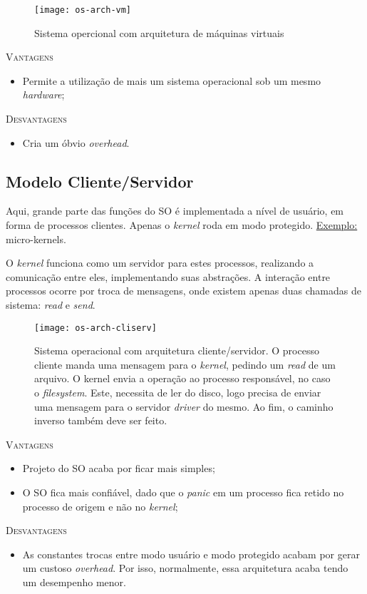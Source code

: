 \begin{figure}[ht]
  \centering
  \texttt{[image: os-arch-vm]}
  \caption{Sistema opercional com arquitetura de máquinas virtuais}
  \label{fig:os-arch-vm}
\end{figure}

\textsc{Vantagens}
\begin{itemize}
  \item Permite a utilização de mais um sistema operacional sob um mesmo \textit{hardware};
\end{itemize}

\textsc{Desvantagens}
\begin{itemize}
  \item Cria um óbvio \textit{overhead}.
\end{itemize}






\subsection{Modelo Cliente/Servidor}
Aqui, grande parte das funções do SO é implementada a nível de usuário, em forma de processos clientes. Apenas o \textit{kernel} roda em modo protegido.
\underline{Exemplo:} micro-kernels.

O \textit{kernel} funciona como um servidor para estes processos, realizando a comunicação entre eles, implementando suas abstrações. A interação entre processos ocorre por troca de mensagens, onde existem apenas duas chamadas de sistema: \textit{read} e \textit{send}.

\begin{figure}[ht]
  \centering
  \texttt{[image: os-arch-cliserv]}
  \caption{Sistema operacional com arquitetura cliente/servidor. O processo cliente manda uma mensagem para o \textit{kernel}, pedindo um \textit{read} de um arquivo. O kernel envia a operação ao processo responsável, no caso o \textit{filesystem}. Este, necessita de ler do disco, logo precisa de enviar uma mensagem para o servidor \textit{driver} do mesmo. Ao fim, o caminho inverso também deve ser feito.}
  \label{fig:os-arch-cliserv}
\end{figure}

\textsc{Vantagens}
\begin{itemize}
  \item Projeto do SO acaba por ficar mais simples;
  \item O SO fica mais confiável, dado que o \textit{panic} em um processo fica retido no processo de origem e não no \textit{kernel};
\end{itemize}

\textsc{Desvantagens}
\begin{itemize}
  \item As constantes trocas entre modo usuário e modo protegido acabam por gerar um custoso \textit{overhead}. Por isso, normalmente, essa arquitetura acaba tendo um desempenho menor.
\end{itemize}
